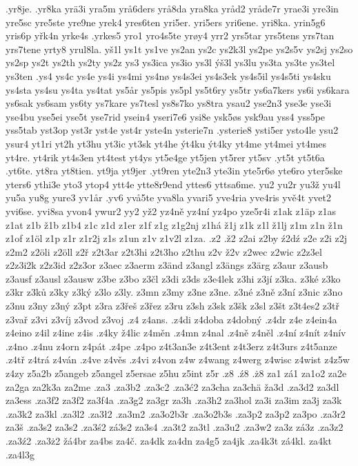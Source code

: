 {{.yr8je.
.yr8ka
yrä3i
yra5m
yrå6ders
yrå8da
yra8ka
yråd2
yråde7r
yrae3i
yre3in
yre5sc
yre5ste
yre9ne
yrek4
yres6ten
yri5er.
yri5ers
yri6ene.
yri8ka.
yrin5g6
yris6p
yřk4n
yrke4s
.yrkes5
yro1
yro4s5te
yrøy4
yrr2
yrs5tar
yrs5tens
yrs7tan
yrs7tene
yrty8
yrul8la.
yš1l
ys1t
ys1ve
ys2an
ys2c
ys2k3l
ys2pe
ys2s5v
ys2sj
ys2so
ys2sp
ys2t
ys2th
ys2ty
ys2z
ys3
ys3ica
ys3io
ys3l
ýš3l
ys3lu
ys3ta
ys3te
ys3tel
ys3ten
.ys4
ys4c
ys4e
ys4i
ys4mi
ys4nø
ys4s3ei
ys4s3ek
ys4s5il
ys4s5ti
ys4sku
ys4sta
ys4su
ys4ta
ys4tat
ys5år
ys5pis
ys5pl
ys5t6ry
ys5tr
ys6a7kers
ys6i
ys6kara
ys6sak
ys6sam
ys6ty
ys7kare
ys7tesl
ys8s7ko
ys8tra
ysau2
yse2n3
yse3e
yse3i
yse4bu
yse5ei
yse5t
yse7rid
ysein4
yseri7e6
ysi8e
ysk5øs
ysk9au
yss4
yss5pe
yss5tab
yst3op
yst3r
yst4e
yst4r
yste4n
ysterie7n
.ysterie8
ysti5er
ysto4le
ysu2
ysur4
yt1ri
yt2h
yt3hu
yt3ic
yt3sk
yt4he
ýt4ku
ýt4ky
yt4me
yt4mei
yt4mes
yt4re.
yt4rik
yt4s3en
yt4test
yt4ys
yt5e4ge
yt5jen
yt5rer
yt5sv
.yt5t
yt5t6a
.yt6te.
yt8ra
yt8tien.
yt9ja
yt9jer
.yt9ren
yte2n3
yte3in
yte5r6ø
yte6ro
yter5ske
yters6
ythi3e
yto3
ytop4
ytt4e
ytte8r9end
yttes6
yttsa6me.
yu2
yu2r
yu3ž
yu4l
yu5a
yu8g
yure3
yv1år
.yv6
yvå5te
yva8la
yvari5
yve4ria
yve4ris
yvě4t
yvet2
yvi6se.
yvi8sa
yvon4
ywur2
yy2
yž2
yz4ně
yz4ní
yz4po
yze5r4i
z1ak
z1äp
z1as
z1at
z1b
ž1b
z1b4
z1c
z1d
z1er
z1f
z1g
z1g2nj
z1há
ž1j
z1k
z1l
ž1lj
z1m
z1n
ž1n
z1of
z1öl
z1p
z1r
z1r2j
z1s
z1un
z1v
z1v2l
z1za.
.z2
.ž2
z2ai
z2by
ź2dź
z2e
z2i
z2j
z2m2
z2öli
z2öll
z2ř
z2t3ar
z2t3hi
z2t3ho
z2thu
z2v
ž2v
z2wec
z2wic
z2z3el
z2z3i2k
z2z3id
z2z3or
z3aec
z3aerm
z3änd
z3angl
z3ängs
z3ärg
z3aur
z3ausb
z3ausf
z3ausl
z3ausw
z3be
z3bo
z3čl
z3di
z3ds
z3e4lek
z3hi
z3jí
z3ka.
z3ké
z3ko
z3kr
z3ků
z3ky
z3ký
z3lo
z3ly.
z3mn
z3my
z3ne
z3ne.
z3né
z3ně
z3ní
z3nic
z3no
z3nu
z3ny
z3ný
z3pt
z3ra
z3řeš
z3řez
z3ru
z3sh
z3sk
z3šk
z3sl
z3št
z3t4es2
z3tř
z3vař
z3vi
z3víj
z3vod
z3voj
.z4
z4ans.
.z4di
z4doba
z4dobný
.z4dr
z4e
z4ein4a
z4eino
z4il
z4ine
z4is
.z4ky
ž4lic
z4měn
.z4mn
z4nal
.z4ně
z4něl
.z4ní
z4nít
z4nív
.z4no
.z4nu
z4orn
z4pát
.z4pe
.z4po
z4t3an3e
z4t3ent
z4t3erz
z4t3urs
z4t5anze
.z4tř
z4trá
z4ván
.z4ve
z4věs
.z4vi
z4von
z4w
z4wang
z4werg
z4wisc
z4wist
z4z5w
z4zy
z5a2b
z5angeb
z5angel
z5ersae
z5hu
z5int
z5r
.z8
.ź8
.ż8
za1
zá1
za1o2
za2e
za2ga
za2k3a
za2me
.za3
.za3b2
.za3c2
.za3ć2
za3cha
za3chä
ža3d
.za3d2
za3dl
za3ess
.za3f2
za3f2
za3f4a
.za3g2
za3gr
za3h
.za3h2
za3hol
za3i
za3im
za3j
za3k
.za3k2
za3kl
.za3l2
.za3ł2
.za3m2
.za3o2b3r
.za3o2b3s
.za3p2
za3p2
za3po
.za3r2
za3š
.za3s2
za3s2
.za3ś2
zá3s2
za3s4
.za3t2
za3tl
.za3u2
.za3w2
za3z
zá3z
.za3z2
.za3ź2
.za3ż2
žá4br
za4bs
za4č.
za4dk
za4dn
za4g5
za4jk
.za4k3t
zá4kl.
za4kt
.za4l3g
}}
